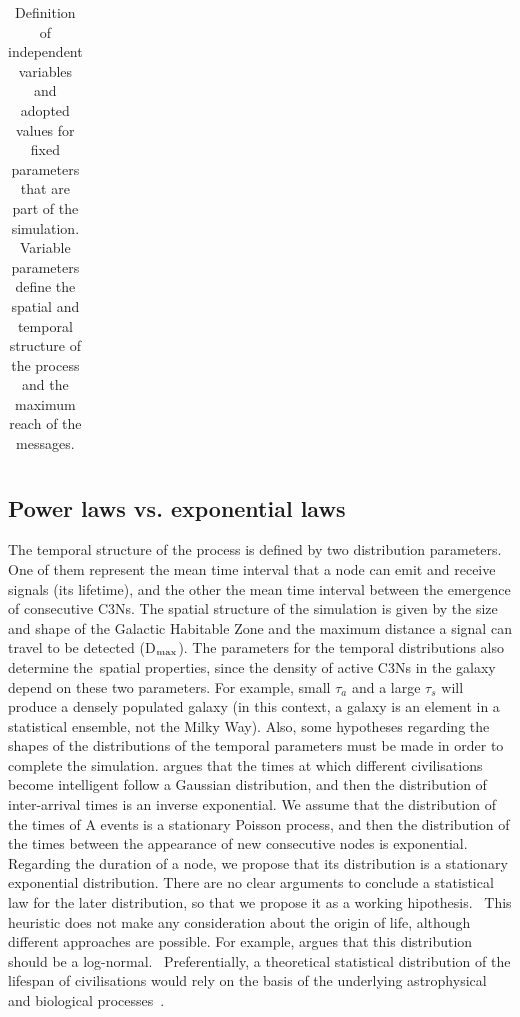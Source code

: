 \documentclass[crop]{CSLB}
\newcommand{\cetis}{C3Ns}
\begin{document}
\begin{table}
\begin{tabular}{cllll}
\hline
\end{tabular}
\caption{Definition of independent variables and adopted values for 
   fixed parameters 
   that are part of the simulation.  Variable parameters define the
   spatial and temporal structure
   of the process and the maximum reach of the messages.}
\label{T_simu_hypotheses}
\end{table}
 
    

\subsection{Power laws vs. exponential laws}\label{SS_PDF_shape}

The temporal structure of the process is defined by two distribution
parameters. One of them represent the mean time interval that a node can
emit and receive signals (its lifetime), and the other the mean time interval between the
emergence of consecutive \cetis{}.
%
The spatial structure of the simulation is
given by the size and shape of the Galactic Habitable Zone and the maximum
distance a signal can travel to be detected (D$_{\rm max}$). The parameters for
the temporal distributions also determine the spatial properties, since the
density of active \cetis{} in the galaxy depend on these two parameters. For
example, small $\tau_a$ and a large $\tau_s$ will produce a densely
populated galaxy (in this context, a galaxy is an element in a 
statistical ensemble, not the Milky Way).
%
Also, some hypotheses regarding the shapes of the
distributions of the temporal parameters must be made in order to complete the
simulation. \citet{forgan_spatiotemporal_2011} argues that the times at which
different civilisations become intelligent follow a Gaussian distribution, and
then the distribution of inter-arrival times is an inverse exponential. We
assume that the distribution of the times of A events is a stationary Poisson
process, and then the distribution of the times between the appearance of new
consecutive nodes is exponential. Regarding the duration of a node, we
propose that its distribution is a stationary
exponential distribution.  There are no clear arguments to conclude a
statistical law for the later distribution, so that we propose it as a working
hipothesis.  
%
This heuristic does not make any consideration about the origin of life, although
different approaches are possible.
%
For example,
\citet{maccone_lognormals_2014} argues that this distribution should be a log-normal. 
%
Preferentially, a theoretical statistical distribution of the lifespan of
civilisations would rely on the basis of the underlying
astrophysical and biological processes \citep{balbi_impact_2018}. 
\end{document}
